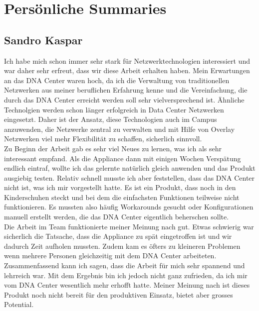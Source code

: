 \section{Persönliche Summaries}
\subsection{Sandro Kaspar}
Ich habe mich schon immer sehr stark für Netzwerktechnologien interessiert und war daher sehr erfreut, dass wir diese Arbeit erhalten haben. Mein Erwartungen an das DNA Center waren hoch, da ich die Verwaltung von traditionellen Netzwerken aus meiner beruflichen Erfahrung kenne und die Vereinfachung, die durch das DNA Center erreicht werden soll sehr vielversprechend ist. Ähnliche Technolgien werden schon länger erfolgreich in Data Center Netzwerken eingesetzt. Daher ist der Ansatz, diese Technologien auch im Campus anzuwenden, die Netzwerke zentral zu verwalten und mit Hilfe von Overlay Netzwerken viel mehr Flexibilität zu schaffen, sicherlich sinnvoll. \\
Zu Beginn der Arbeit gab es sehr viel Neues zu lernen, was ich als sehr interessant empfand. Als die Appliance dann mit einigen Wochen Verspätung endlich eintraf, wollte ich das gelernte natürlich gleich anwenden und das Produkt ausgiebig testen. Relativ schnell musste ich aber feststellen, dass das DNA Center nicht ist, was ich mir vorgestellt hatte. Es ist ein Produkt, dass noch in den Kinderschuhen steckt und bei dem die einfachsten Funktionen teilweise nicht funktionieren. Es mussten also häufig Workarounds gesucht oder Konfigurationen manuell erstellt werden, die das DNA Center eigentlich beherschen sollte. \\
Die Arbeit im Team funktionierte meiner Meinung nach gut. Etwas schwierig war sicherlich die Tatsache, dass die Appliance zu spät eingetroffen ist und wir dadurch Zeit aufholen mussten. Zudem kam es öfters zu kleineren Problemen wenn mehrere Personen gleichzeitig mit dem DNA Center arbeiteten. \\
Zusammenfassend kann ich sagen, dass die Arbeit für mich sehr spannend und lehrreich war. Mit dem Ergebnis bin ich jedoch nicht ganz zufrieden, da ich mir vom DNA Center wesentlich mehr erhofft hatte. Meiner Meinung nach ist dieses Produkt noch nicht bereit für den produktiven Einsatz, bietet aber grosses Potential.

